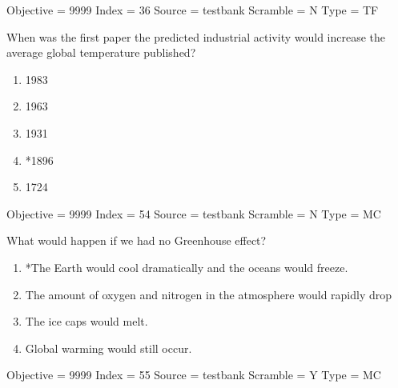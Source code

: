 \documentclass[11pt]{article}
\begin{document}
\begin{enumerate}
\begin{minipage}{\textwidth}
\begin{minipage}{\textwidth}
Objective = 9999
Index = 36
Source = testbank
Scramble = N
Type = TF
\end{minipage}
\end{minipage}
\vskip 0.20in

\begin{minipage}{\textwidth}
\begin{minipage}{\textwidth}
\item When was the first paper the predicted industrial activity would increase the average global temperature published?
\begin{multicols}{3}
\begin{enumerate} 
\setlength{\itemsep}{1pt} 
\setlength{\parskip}{0pt} 
\setlength{\parsep}{0pt}
\setlength{\multicolsep}{1pt} 
\item 1983
\item 1963
\item 1931
\item *1896
\item 1724
\end{enumerate} 
\vfill 
\end{multicols}

Objective = 9999
Index = 54
Source = testbank
Scramble = N
Type = MC
\end{minipage}
\end{minipage}
\vskip 0.20in

\begin{minipage}{\textwidth}
\begin{minipage}{\textwidth}
\item What would happen if we had no Greenhouse effect?
\begin{enumerate} 
\setlength{\itemsep}{1pt} 
\setlength{\parskip}{0pt} 
\setlength{\parsep}{0pt}
\setlength{\multicolsep}{1pt} 
\item *The Earth would cool dramatically and the oceans would freeze.
\item The amount of oxygen and nitrogen in the atmosphere would rapidly drop
\item The ice caps would melt.
\item Global warming would still occur.
\end{enumerate} 
Objective = 9999
Index = 55
Source = testbank
Scramble = Y
Type = MC
\end{minipage}
\end{minipage}
\vskip 0.20in


\end{enumerate}
\end{document}
